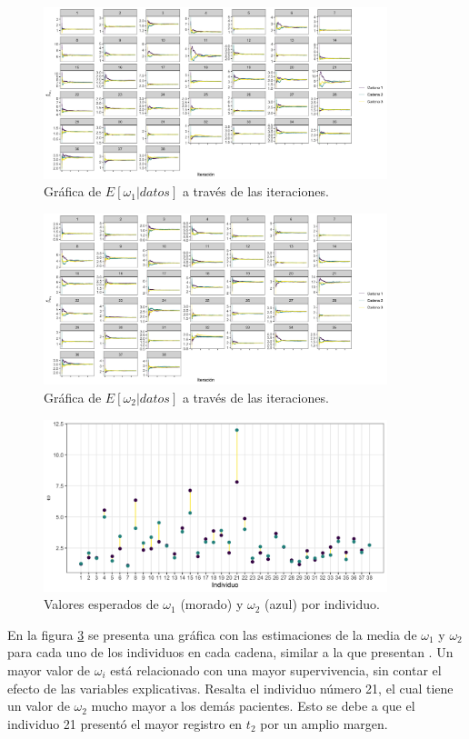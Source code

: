 \documentclass[11pt,a4paper]{article}
\begin{document}
\begin{figure}[!htb]
\centering\includegraphics[width=10cm]{ergodic_means_omega1.png}
\caption{Gráfica de $E\left[ \omega_1 | datos \right]$ a través de las iteraciones.}
\label{fig:ergodic_means_omega1}
\end{figure}

\begin{figure}[!htb]
\centering\includegraphics[width=10cm]{ergodic_means_omega2.png}
\caption{Gráfica de $E\left[ \omega_2 | datos\right]$ a través de las iteraciones.}
\label{fig:ergodic_means_omega2}
\end{figure}

\begin{figure}[!htb]
\centering\includegraphics[width=10cm]{frailties.png}
\caption{Valores esperados de $\omega_1$ (morado) y $\omega_2$ (azul) por individuo.}
\label{fig:frailties}
\end{figure}

En la figura \ref{fig:frailties} se presenta una gráfica con las estimaciones de la media de $\omega_1$ y $\omega_2$ para cada uno de los individuos en cada cadena, similar a la que presentan \citet{nieto}. Un mayor valor de $\omega_i$ está relacionado con una mayor supervivencia, sin contar el efecto de las variables explicativas. Resalta el individuo número 21, el cual tiene un valor de $\omega_2$ mucho mayor a los demás pacientes. Esto se debe a que el individuo 21 presentó el mayor registro en $t_2$ por un amplio margen.
\end{document}
